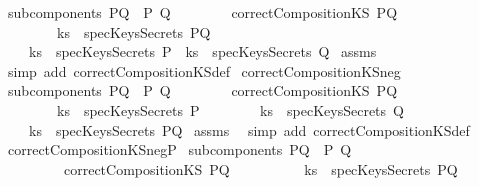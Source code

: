 \begin{isabellebody}
\ {\isachardoublequoteopen}subcomponents\ PQ\ {\isacharequal}\ {\isacharbraceleft}P{\isacharcomma}\ Q{\isacharbraceright}{\isachardoublequoteclose}\isanewline
\ \ \ \ \ \ \ \ {\isachardoublequoteopen}correctCompositionKS\ PQ{\isachardoublequoteclose}\ \isanewline
\ \ \ \ \ \ \ \ {\isachardoublequoteopen}ks\ {\isasymin}\ specKeysSecrets\ PQ{\isachardoublequoteclose}\isanewline
{}\ \ \ \ {\isachardoublequoteopen}ks\ {\isasymin}\ specKeysSecrets\ P\ {\isasymor}\ ks\ {\isasymin}\ specKeysSecrets\ Q{\isachardoublequoteclose}\isanewline
%
\isadelimproof
%
\endisadelimproof
%
\isatagproof
{}\isamarkupfalse%
\ assms\ \isamarkupfalse%
\ {\isacharparenleft}simp\ add{\isacharcolon}\ correctCompositionKS{\isacharunderscore}def{\isacharparenright}%
\endisatagproof
{\isafoldproof}%
%
\isadelimproof
\isanewline
%
\endisadelimproof
\isanewline
{}\isamarkupfalse%
\ correctCompositionKS{\isacharunderscore}neg{}{\isacharcolon}\isanewline
{}\ {\isachardoublequoteopen}subcomponents\ PQ\ {\isacharequal}\ {\isacharbraceleft}P{\isacharcomma}\ Q{\isacharbraceright}{\isachardoublequoteclose}\isanewline
\ \ \ \ \ \ \ \ {\isachardoublequoteopen}correctCompositionKS\ PQ{\isachardoublequoteclose}\ \isanewline
\ \ \ \ \ \ \ \ {\isachardoublequoteopen}ks\ {\isasymnotin}\ specKeysSecrets\ P{\isachardoublequoteclose}\isanewline
\ \ \ \ \ \ \ \ {\isachardoublequoteopen}ks\ {\isasymnotin}\ specKeysSecrets\ Q{\isachardoublequoteclose}\isanewline
{}\ \ \ \ {\isachardoublequoteopen}ks\ {\isasymnotin}\ specKeysSecrets\ PQ{\isachardoublequoteclose}\isanewline
%
\isadelimproof
%
\endisadelimproof
%
\isatagproof
{}\isamarkupfalse%
\ assms\ \isamarkupfalse%
\ {\isacharparenleft}simp\ add{\isacharcolon}\ correctCompositionKS{\isacharunderscore}def{\isacharparenright}%
\endisatagproof
{\isafoldproof}%
%
\isadelimproof
\isanewline
%
\endisadelimproof
\isanewline
{}\isamarkupfalse%
\ correctCompositionKS{\isacharunderscore}negP{\isacharcolon}\isanewline
{}\ {\isachardoublequoteopen}subcomponents\ PQ\ {\isacharequal}\ {\isacharbraceleft}P{\isacharcomma}\ Q{\isacharbraceright}{\isachardoublequoteclose}\isanewline
\ \ \ \ \ \ \ \ \ {\isachardoublequoteopen}correctCompositionKS\ PQ{\isachardoublequoteclose}\ \isanewline
\ \ \ \ \ \ \ \ \ {\isachardoublequoteopen}ks\ {\isasymnotin}\ specKeysSecrets\ PQ{\isachardoublequoteclose}\ \isanewline

\end{isabellebody}
